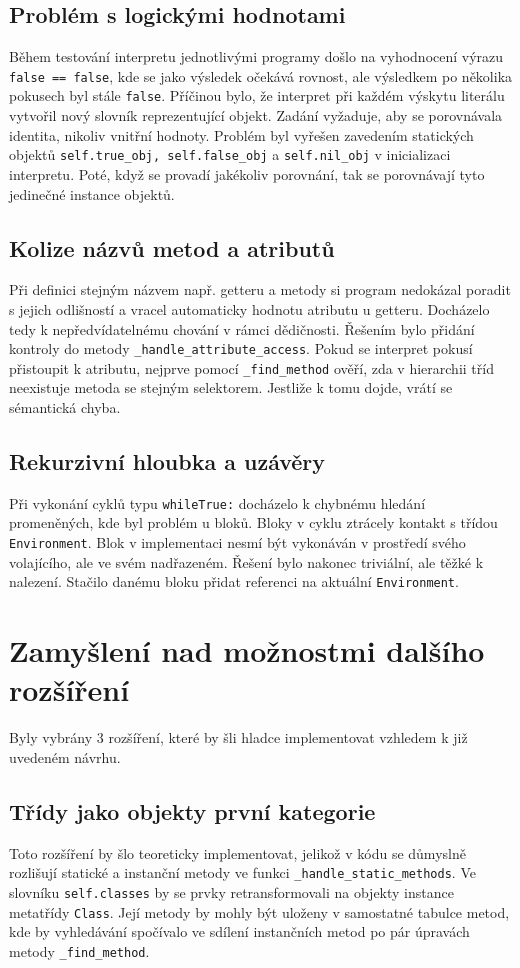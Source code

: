 \documentclass[a4paper,12pt]{article}
\begin{document}
\subsection{Problém s logickými hodnotami}
Během testování interpretu jednotlivými programy došlo na vyhodnocení výrazu \texttt{false == false}, kde se jako výsledek očekává
rovnost, ale výsledkem po několika pokusech byl stále \texttt{false}. Příčinou bylo, že interpret při každém výskytu literálu
vytvořil nový slovník reprezentující objekt. Zadání vyžaduje, aby se porovnávala identita, nikoliv vnitřní hodnoty.
Problém byl vyřešen zavedením statických objektů \texttt{self.true\_obj, self.false\_obj} a \texttt{self.nil\_obj} v inicializaci interpretu.
Poté, když se provadí jakékoliv porovnání, tak se porovnávají tyto jedinečné instance objektů.

\subsection{Kolize názvů metod a atributů}
Při definici stejným názvem např. getteru a metody si program nedokázal poradit s jejich odlišností a vracel automaticky
hodnotu atributu u getteru. Docházelo tedy k nepředvídatelnému chování v rámci dědičnosti. 
Řešením bylo přidání kontroly do metody \texttt{\_handle\_attribute\_access}. 
Pokud se interpret pokusí přistoupit k atributu, 
nejprve pomocí \texttt{\_find\_method} ověří, zda v hierarchii tříd neexistuje metoda se stejným selektorem.
Jestliže k tomu dojde, vrátí se sémantická chyba.

\subsection{Rekurzivní hloubka a uzávěry}
Při vykonání cyklů typu \texttt{whileTrue:} docházelo k chybnému hledání promeněných, kde byl problém u bloků.
Bloky v cyklu ztrácely kontakt s třídou \texttt{Environment}. Blok v implementaci nesmí být vykonáván v prostředí 
svého volajícího, ale ve svém nadřazeném. Řešení bylo nakonec triviální, ale těžké k nalezení. 
Stačilo danému bloku přidat referenci na aktuální \texttt{Environment}.

\section{Zamyšlení nad možnostmi dalšího rozšíření}
Byly vybrány 3 rozšíření, které by šli hladce implementovat vzhledem k již uvedeném návrhu.

\subsection{Třídy jako objekty první kategorie}
Toto rozšíření by šlo teoreticky implementovat, jelikož v kódu se důmyslně rozlišují statické a instanční metody ve funkci \texttt{\_handle\_static\_methods}.
Ve slovníku \texttt{self.classes} by se prvky retransformovali na objekty instance metatřídy \texttt{Class}. Její metody by mohly být uloženy v samostatné
tabulce metod, kde by vyhledávání spočívalo ve sdílení instančních metod po pár úpravách metody \texttt{\_find\_method}.
\end{document}
